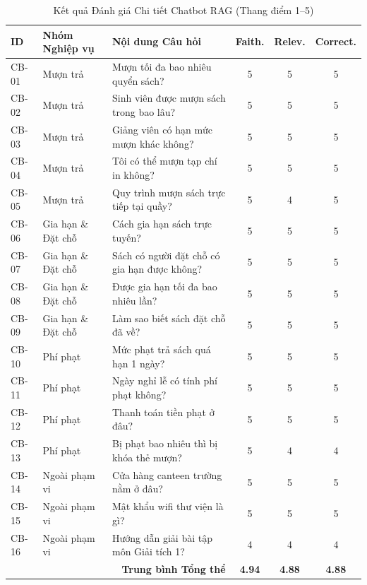 \begin{table}[H]
\centering
\caption{Kết quả Đánh giá Chi tiết Chatbot RAG (Thang điểm 1--5)}
\label{tab:chatbot_eval_results}
\begin{tabularx}{\textwidth}{|l|p{3.2cm}|X|c|c|c|}
\hline
\textbf{ID} & \textbf{Nhóm Nghiệp vụ} & \textbf{Nội dung Câu hỏi} & \textbf{Faith.} & \textbf{Relev.} & \textbf{Correct.} \\
\hline
CB-01 & Mượn trả & Mượn tối đa bao nhiêu quyển sách? & 5 & 5 & 5 \\
\hline
CB-02 & Mượn trả & Sinh viên được mượn sách trong bao lâu? & 5 & 5 & 5 \\
\hline
CB-03 & Mượn trả & Giảng viên có hạn mức mượn khác không? & 5 & 5 & 5 \\
\hline
CB-04 & Mượn trả & Tôi có thể mượn tạp chí in không? & 5 & 5 & 5 \\
\hline
CB-05 & Mượn trả & Quy trình mượn sách trực tiếp tại quầy? & 5 & 4 & 5 \\
\hline
CB-06 & Gia hạn \& Đặt chỗ & Cách gia hạn sách trực tuyến? & 5 & 5 & 5 \\
\hline
CB-07 & Gia hạn \& Đặt chỗ & Sách có người đặt chỗ có gia hạn được không? & 5 & 5 & 5 \\
\hline
CB-08 & Gia hạn \& Đặt chỗ & Được gia hạn tối đa bao nhiêu lần? & 5 & 5 & 5 \\
\hline
CB-09 & Gia hạn \& Đặt chỗ & Làm sao biết sách đặt chỗ đã về? & 5 & 5 & 5 \\
\hline
CB-10 & Phí phạt & Mức phạt trả sách quá hạn 1 ngày? & 5 & 5 & 5 \\
\hline
CB-11 & Phí phạt & Ngày nghỉ lễ có tính phí phạt không? & 5 & 5 & 5 \\
\hline
CB-12 & Phí phạt & Thanh toán tiền phạt ở đâu? & 5 & 5 & 5 \\
\hline
CB-13 & Phí phạt & Bị phạt bao nhiêu thì bị khóa thẻ mượn? & 5 & 4 & 4 \\
\hline
CB-14 & Ngoài phạm vi & Cửa hàng canteen trường nằm ở đâu? & 5 & 5 & 5 \\
\hline
CB-15 & Ngoài phạm vi & Mật khẩu wifi thư viện là gì? & 5 & 5 & 5 \\
\hline
CB-16 & Ngoài phạm vi & Hướng dẫn giải bài tập môn Giải tích 1? & 4 & 4 & 4 \\
\hline
\multicolumn{3}{|r|}{\textbf{Trung bình Tổng thể}} & \textbf{4.94} & \textbf{4.88} & \textbf{4.88} \\
\hline
\end{tabularx}
\end{table}

